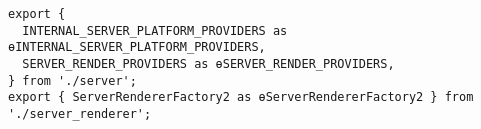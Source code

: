 \begin{verbatim}
export {
  INTERNAL_SERVER_PLATFORM_PROVIDERS as ɵINTERNAL_SERVER_PLATFORM_PROVIDERS,
  SERVER_RENDER_PROVIDERS as ɵSERVER_RENDER_PROVIDERS,
} from './server';
export { ServerRendererFactory2 as ɵServerRendererFactory2 } from './server_renderer';
\end{verbatim}
